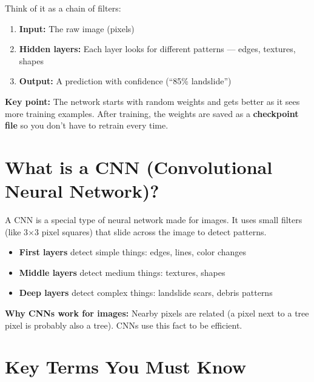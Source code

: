 \documentclass[11pt]{article}
\begin{document}
Think of it as a chain of filters:
\begin{enumerate}[noitemsep]
    \item \textbf{Input:} The raw image (pixels)
    \item \textbf{Hidden layers:} Each layer looks for different patterns --- edges, textures, shapes
    \item \textbf{Output:} A prediction with confidence (``85\% landslide'')
\end{enumerate}

\textbf{Key point:} The network starts with random weights and gets better as it sees more training examples. After training, the weights are saved as a \textbf{checkpoint file} so you don't have to retrain every time.

\section{What is a CNN (Convolutional Neural Network)?}

A CNN is a special type of neural network made for images. It uses small filters (like 3$\times$3 pixel squares) that slide across the image to detect patterns.

\begin{itemize}[noitemsep]
    \item \textbf{First layers} detect simple things: edges, lines, color changes
    \item \textbf{Middle layers} detect medium things: textures, shapes
    \item \textbf{Deep layers} detect complex things: landslide scars, debris patterns
\end{itemize}

\textbf{Why CNNs work for images:} Nearby pixels are related (a pixel next to a tree pixel is probably also a tree). CNNs use this fact to be efficient.

\section{Key Terms You Must Know}
\end{document}
